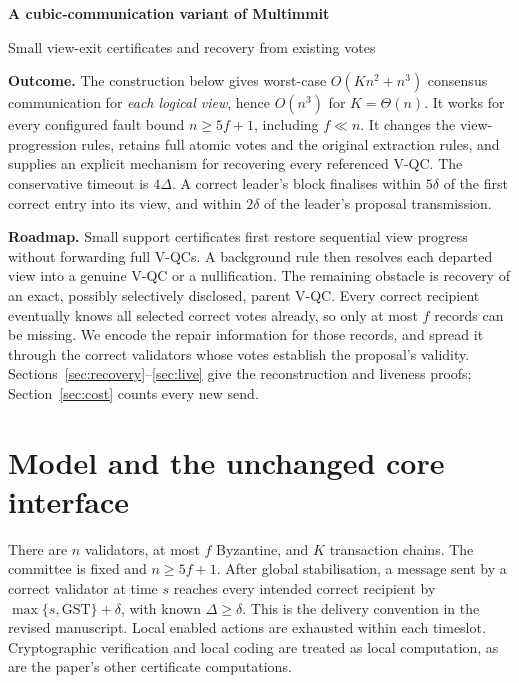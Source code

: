 \documentclass[11pt,a4paper]{article}
\theoremstyle{definition}
\newcommand{\GST}{\mathrm{GST}}
\begin{document}
\begin{center}
{\LARGE\bfseries A cubic-communication variant of Multimmit}\par
\vspace{6pt}
{\large Small view-exit certificates and recovery from existing votes}
\end{center}

\textbf{Outcome.} The construction below gives worst-case
\(O(Kn^2+n^3)\) consensus communication for \emph{each logical view}, hence
\(O(n^3)\) for \(K=\Theta(n)\). It works for every configured fault bound
\(n\ge5f+1\), including \(f\ll n\). It changes the view-progression rules,
retains full atomic votes and the original extraction rules, and supplies an
explicit mechanism for recovering every referenced V-QC. The conservative
timeout is \(4\Delta\). A correct leader's block finalises within \(5\delta\)
of the first correct entry into its view, and within \(2\delta\) of the
leader's proposal transmission.

\textbf{Roadmap.} Small support certificates first restore sequential view
progress without forwarding full V-QCs. A background rule then resolves each
departed view into a genuine V-QC or a nullification. The remaining obstacle
is recovery of an exact, possibly selectively disclosed, parent V-QC. Every
correct recipient eventually knows all selected correct votes already, so
only at most \(f\) records can be missing. We encode the repair information
for those records, and spread it through the correct validators whose votes
establish the proposal's validity. Sections~\ref{sec:recovery}--\ref{sec:live}
give the reconstruction and liveness proofs; Section~\ref{sec:cost} counts
every new send.


\section{Model and the unchanged core interface}
\label{sec:model}

There are \(n\) validators, at most \(f\) Byzantine, and \(K\) transaction
chains. The committee is fixed and \(n\ge5f+1\). After global stabilisation,
a message sent by a correct validator at time \(s\) reaches every intended
correct recipient by \(\max\{s,\GST\}+\delta\), with known
\(\Delta\ge\delta\). This is the delivery convention in the revised
manuscript. Local enabled actions are exhausted within each timeslot.
Cryptographic verification and local coding are treated as local computation,
as are the paper's other certificate computations.
\end{document}

